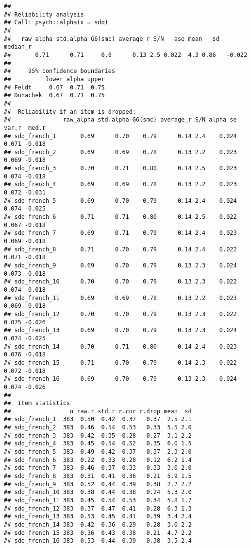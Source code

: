 \documentclass[
]{article}
\begin{document}
\begin{verbatim}
## 
## Reliability analysis   
## Call: psych::alpha(x = sdo)
## 
##   raw_alpha std.alpha G6(smc) average_r S/N   ase mean   sd median_r
##       0.71      0.71     0.8      0.13 2.5 0.022  4.3 0.86   -0.022
## 
##     95% confidence boundaries 
##          lower alpha upper
## Feldt     0.67  0.71  0.75
## Duhachek  0.67  0.71  0.75
## 
##  Reliability if an item is dropped:
##               raw_alpha std.alpha G6(smc) average_r S/N alpha se var.r  med.r
## sdo_french_1       0.69      0.70    0.79      0.14 2.4    0.024 0.071 -0.018
## sdo_french_2       0.69      0.69    0.78      0.13 2.2    0.023 0.069 -0.018
## sdo_french_3       0.70      0.71    0.80      0.14 2.5    0.023 0.074 -0.018
## sdo_french_4       0.69      0.69    0.78      0.13 2.2    0.023 0.072 -0.031
## sdo_french_5       0.69      0.70    0.79      0.14 2.4    0.024 0.074 -0.025
## sdo_french_6       0.71      0.71    0.80      0.14 2.5    0.022 0.067 -0.018
## sdo_french_7       0.69      0.71    0.79      0.14 2.4    0.023 0.069 -0.018
## sdo_french_8       0.71      0.70    0.79      0.14 2.4    0.022 0.071 -0.018
## sdo_french_9       0.69      0.70    0.79      0.13 2.3    0.024 0.073 -0.018
## sdo_french_10      0.70      0.70    0.79      0.13 2.3    0.022 0.074 -0.018
## sdo_french_11      0.69      0.69    0.78      0.13 2.2    0.023 0.069 -0.018
## sdo_french_12      0.70      0.70    0.79      0.13 2.3    0.022 0.075 -0.026
## sdo_french_13      0.69      0.70    0.79      0.13 2.3    0.024 0.074 -0.025
## sdo_french_14      0.70      0.71    0.80      0.14 2.4    0.023 0.076 -0.018
## sdo_french_15      0.71      0.70    0.79      0.14 2.3    0.022 0.072 -0.018
## sdo_french_16      0.69      0.70    0.79      0.13 2.3    0.024 0.074 -0.026
## 
##  Item statistics 
##                 n raw.r std.r r.cor r.drop mean  sd
## sdo_french_1  383  0.50  0.42  0.37   0.37  2.5 2.1
## sdo_french_2  383  0.46  0.54  0.53   0.33  5.5 2.0
## sdo_french_3  383  0.42  0.35  0.28   0.27  3.1 2.2
## sdo_french_4  383  0.45  0.54  0.52   0.35  6.0 1.5
## sdo_french_5  383  0.49  0.42  0.37   0.37  2.3 2.0
## sdo_french_6  383  0.22  0.33  0.28   0.12  6.2 1.4
## sdo_french_7  383  0.46  0.37  0.33   0.33  3.0 2.0
## sdo_french_8  383  0.31  0.41  0.36   0.21  5.9 1.5
## sdo_french_9  383  0.52  0.44  0.39   0.38  2.2 2.2
## sdo_french_10 383  0.38  0.44  0.38   0.24  5.3 2.0
## sdo_french_11 383  0.45  0.54  0.53   0.34  5.8 1.7
## sdo_french_12 383  0.37  0.47  0.41   0.28  6.3 1.3
## sdo_french_13 383  0.53  0.45  0.41   0.39  3.4 2.4
## sdo_french_14 383  0.42  0.36  0.29   0.28  3.0 2.2
## sdo_french_15 383  0.36  0.43  0.38   0.21  4.7 2.2
## sdo_french_16 383  0.53  0.44  0.39   0.38  3.5 2.4
\end{verbatim}
\end{document}
